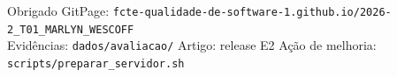\documentclass[aspectratio=169,10pt]{beamer}
\begin{document}
\begin{frame}{Obrigado}
\centering
\Large GitPage: \texttt{fcte-qualidade-de-software-1.github.io/2026-2\_T01\_MARLYN\_WESCOFF}\\[1em]
\normalsize Evidências: \texttt{dados/avaliacao/} \textperiodcentered{} Artigo: release E2 \textperiodcentered{} Ação de melhoria: \texttt{scripts/preparar\_servidor.sh}
\end{frame}
\end{document}
